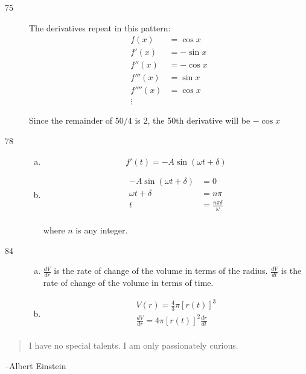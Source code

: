 \documentclass[letterpaper, landscape]{exam}
\begin{document}
\begin{description}
    \item[75]
      The derivatives repeat in this pattern:
      \begin{align*}
        f(x)     & = \cos x \\
        f'(x)    & = -\sin x \\
        f''(x)   & = -\cos x \\
        f'''(x)  & = \sin x \\
        f''''(x) & = \cos x \\
        \vdots
      \end{align*}

      Since the remainder of $50/4$ is 2, the 50th derivative will be $-\cos x$

    \item[78] 
      \begin{enumerate}[(a)]
        \item 
          \[
            f'(t) = -A \sin(\omega t + \delta)
          \]

        \item 
          \begin{align*}
            -A \sin(\omega t + \delta) & = 0 \\
            \omega t + \delta          & = n \pi \\
            t                          & = \boxed{ \frac{n \pi \delta}{\omega} } \\
          \end{align*}

          where $n$ is any integer.

      \end{enumerate}

    \item[84] 
      \begin{enumerate}[(a)]
        \item $\frac{dV}{dr}$ is the rate of change of the volume in terms of the radius.
          $\frac{dV}{dt}$ is the rate of change of the volume in terms of time.

        \item
          \begin{align*}
            V(r) = \frac{4}{3} \pi [r(t)]^3 \\
            \frac{dV}{dr} = 4 \pi [r(t)]^2 \frac{dr}{dt} \\
          \end{align*}
      \end{enumerate}
      
  \end{description}

  \else
    \vspace{10 cm}
    \begin{quote}
      \begin{em}
        I have no special talents. I am only passionately curious. 
      \end{em}
    \end{quote}
    \hspace{2 cm} --Albert Einstein
  \fi
\end{document}
